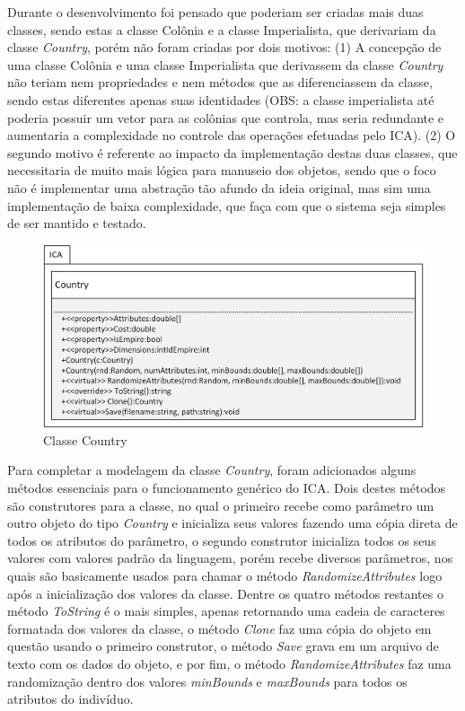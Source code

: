 Durante o desenvolvimento foi pensado que poderiam ser criadas mais duas classes, sendo estas a classe Colônia e a classe Imperialista, que derivariam da classe \emph{Country}, porém não foram criadas por dois motivos: (1) A concepção de uma classe Colônia e uma classe Imperialista que derivassem da classe \emph{Country} não teriam nem propriedades e nem métodos que as diferenciassem da classe, sendo estas diferentes apenas suas identidades (OBS: a classe imperialista até poderia possuir um vetor para as colônias que controla, mas seria redundante e aumentaria a complexidade no controle das operações efetuadas pelo ICA). (2) O segundo motivo é referente ao impacto da implementação destas duas classes, que necessitaria de muito mais lógica para manuseio dos objetos, sendo que o foco não é implementar uma abstração tão afundo da ideia original, mas sim uma implementação de baixa complexidade, que faça com que o sistema seja simples de ser mantido e testado. 

\begin{figure}[h]
	\centering	
	\includegraphics[scale=1]{Figuras/ClassesICA-Country.png}
	\caption{Classe Country}
	\label{fig:ClassesICA-Country}
	\end{figure}

Para completar a modelagem da classe \emph{Country}, foram adicionados alguns métodos essenciais para o funcionamento genérico do ICA. Dois destes métodos são construtores para a classe, no qual o primeiro recebe como parâmetro um outro objeto do tipo \emph{Country} e inicializa seus valores fazendo uma cópia direta de todos os atributos do parâmetro, o segundo construtor inicializa todos os seus valores com valores padrão da linguagem, porém recebe diversos parâmetros, nos quais são basicamente usados para chamar o método \emph{RandomizeAttributes} logo após a inicialização dos valores da classe. Dentre os quatro métodos restantes o método \emph{ToString} é o mais simples, apenas retornando uma cadeia de caracteres formatada dos valores da classe, o método \emph{Clone} faz uma cópia do objeto em questão usando o primeiro construtor, o método \emph{Save} grava em um arquivo de texto com os dados do objeto, e por fim, o método \emph{RandomizeAttributes} faz uma randomização dentro dos valores \emph{minBounds} e \emph{maxBounds} para todos os atributos do indivíduo. 


